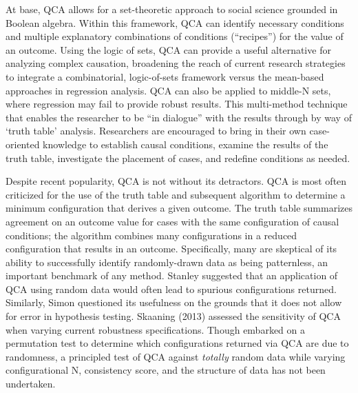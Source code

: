 \documentclass[]{article}
\begin{document}
{%

At base, QCA allows for a set-theoretic approach to social science grounded in Boolean algebra. Within this framework, QCA can identify necessary conditions and multiple explanatory combinations of conditions (``recipes'') for the value of an outcome. Using the logic of sets, QCA can provide a useful alternative for analyzing complex causation, broadening the reach of current research strategies to integrate a combinatorial, logic-of-sets framework versus the mean-based approaches in regression analysis. QCA can also be applied to middle-N sets, where regression may fail to provide robust results. This multi-method technique that enables the researcher to be ``in dialogue'' with the results through by way of `truth table' analysis. Researchers are encouraged to bring in their own case-oriented knowledge to establish causal conditions, examine the results of the truth table, investigate the placement of cases, and redefine conditions as needed. %


Despite recent popularity, QCA is not without its detractors. QCA is most often criticized for the use of the truth table and subsequent algorithm to determine a minimum configuration that derives a given outcome. The truth table summarizes agreement on an outcome value for cases with the same configuration of causal conditions; the algorithm combines many configurations in a reduced configuration that results in an outcome. Specifically, many are skeptical of its ability to successfully identify randomly-drawn data as being patternless, an important benchmark of any method. Stanley \citet{lieberson_2004} suggested that an application of QCA using random data would often lead to spurious configurations returned. Similarly, Simon \citet{hug_2013} questioned its usefulness on the grounds that it does not allow for error in hypothesis testing. Skaaning (2013) assessed the sensitivity of QCA when varying current robustness specifications. Though \citet{braumoeller_2015} embarked on a permutation test to determine which configurations returned via QCA are due to randomness, a principled test of QCA against {\it{totally}} random data while varying configurational N, consistency score, and the structure of data has not been undertaken.

}
\end{document}
